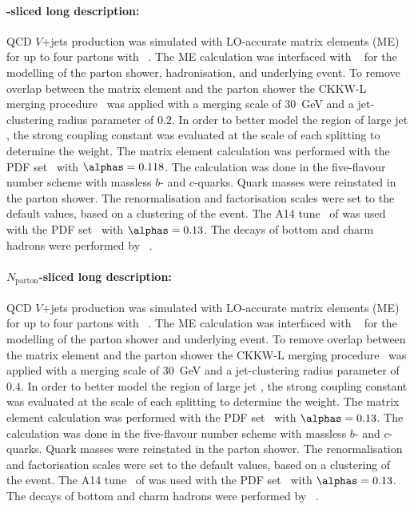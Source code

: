 \paragraph{\HT-sliced long description:}

QCD \(V\)+jets production was simulated with LO-accurate matrix elements (ME)
for up to four partons with \MGNLO[2.2.2]~\cite{Alwall:2014hca}. The ME calculation was interfaced with
\PYTHIA[8.186]~\cite{Sjostrand:2007gs} for the modelling of the parton
shower, hadronisation, and underlying event. To remove overlap between the matrix
element and the parton shower the CKKW-L merging
procedure~\cite{Lonnblad:2001iq,Lonnblad:2011xx} was applied with a
merging scale of \SI{30}{\GeV} and a jet-clustering radius parameter of
\(0.2\). In order to better model the region of large jet \pT, the
strong coupling constant \alphas was evaluated at the scale of each splitting to
determine the weight. The matrix element calculation was performed with
the \NNPDF[3.0nlo] PDF set~\cite{Ball:2014uwa} with \(\alphas= 0.118\). The calculation was done
in the five-flavour number scheme with massless \(b\)- and
\(c\)-quarks. Quark masses were reinstated in the \PYTHIA[8] parton shower.
The renormalisation and factorisation scales were set to the \MADGRAPH default
values, based on a clustering of the event. The A14
tune~\cite{ATL-PHYS-PUB-2014-021} of \PYTHIA[8] was used with the
\NNPDF[2.3lo] PDF set~\cite{Ball:2012cx} with \(\alphas=0.13\).
The decays of bottom and charm hadrons were performed by \EVTGEN[1.2.0]~\cite{Lange:2001uf}.


\paragraph{\(N_\text{parton}\)-sliced long description:}

QCD \(V\)+jets production was simulated with LO-accurate matrix elements (ME) for up to four partons with
\MGNLO[2.2.2]~\cite{Alwall:2014hca}. The ME calculation was interfaced
with \PYTHIA[8.186]~\cite{Sjostrand:2007gs} for the modelling of the parton
shower and underlying event. To remove overlap between the matrix
element and the parton shower the CKKW-L merging
procedure~\cite{Lonnblad:2001iq,Lonnblad:2011xx} was applied with a
merging scale of \SI{30}{\GeV} and a jet-clustering radius parameter of
\(0.4\). In order to better model the region of large jet \pT, the
strong coupling constant \alphas was evaluated at the scale of each splitting to
determine the weight. The matrix element calculation was performed with
the \NNPDF[2.3lo] PDF set~\cite{Ball:2012cx} with \(\alphas= 0.13\). The calculation was done
in the five-flavour number scheme with massless \(b\)- and
\(c\)-quarks. Quark masses were reinstated in the \PYTHIA[8] parton shower.
The renormalisation and factorisation scales were set to the \MADGRAPH default
values, based on a clustering of the event. The A14 tune~\cite{ATL-PHYS-PUB-2014-021}
of \PYTHIA[8] was used with the \NNPDF[2.3lo] PDF set~\cite{Ball:2012cx} with \(\alphas=0.13\).
The decays of bottom and charm hadrons were performed by \EVTGEN[1.2.0]~\cite{Lange:2001uf}.

